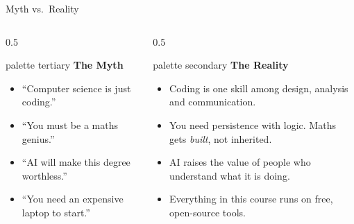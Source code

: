 \documentclass[aspectratio=169]{beamer}
\begin{document}
\begin{frame}{Myth vs.\ Reality}
  \begin{columns}[T]
    \begin{column}{0.5\textwidth}
      \begin{beamercolorbox}[sep=4pt,rounded=true]{palette tertiary}
        \centering\textbf{The Myth}
      \end{beamercolorbox}
      \vspace{4pt}
      \begin{itemize}[<+->]
        \item ``Computer science is just coding.''
        \item ``You must be a maths genius.''
        \item ``AI will make this degree worthless.''
        \item ``You need an expensive laptop to start.''
      \end{itemize}
    \end{column}
    \begin{column}{0.5\textwidth}
      \begin{beamercolorbox}[sep=4pt,rounded=true]{palette secondary}
        \centering\textbf{The Reality}
      \end{beamercolorbox}
      \vspace{4pt}
      \begin{itemize}[<+->]
        \item Coding is one skill among design, analysis and communication.
        \item You need persistence with logic. Maths gets \emph{built}, not inherited.
        \item AI raises the value of people who understand what it is doing.
        \item Everything in this course runs on free, open-source tools.
      \end{itemize}
    \end{column}
  \end{columns}
\end{frame}

\end{document}
